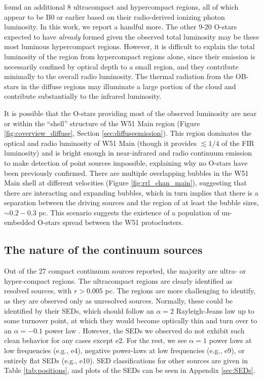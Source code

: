 \citet{Mehringer1994a} found an additional 8 ultracompact and hypercompact \hii
regions, all of which appear to be B0 or earlier based on their radio-derived
ionizing photon luminosity.  In this work, we report a handful more.  The other
9-20 O-stars expected to have \emph{already} formed given the observed total
luminosity may be these most luminous hypercompact \hii regions.  However, it
is difficult to explain the total luminosity of the region from hypercompact
\hii regions alone, since their emission is necessarily confined by optical
depth to a small region, and they contribute minimally to the overall radio
luminosity.  The thermal radiation from the OB-stars in the diffuse \hii
regions may illuminate a large portion of the cloud and contribute
substantially to the
infrared luminosity.

It is possible that the O-stars providing most of the observed
luminosity are near or within the ``shell'' structure of the W51 Main region
(Figure \ref{fig:coverview_diffuse}, Section \ref{sec:diffuseemission}).  This
region dominates the optical and radio luminosity of W51 Main (though it
provides $\lesssim 1/4$ of the FIR luminosity) and is bright enough in
near-infrared and radio continuum emission to make detection of point sources
impossible, explaining why no O-stars have been previously confirmed.  There
are multiple overlapping \hii bubbles in the W51 Main shell at different
velocities (Figure \ref{fig:rrl_chan_main}), suggesting that there are
interacting and  expanding bubbles, which in turn implies that there is a
separation between the driving sources and the \hii region of at least the
bubble sizes, $\sim0.2-0.3$ pc.  This scenario suggests the existence of a
population of un-embedded O-stars spread between the W51 protoclusters.

\subsection{The nature of the continuum sources}
\label{sec:contnature}

Out of the 27 compact continuum sources reported, the majority are ultra- or
hyper-compact \hii regions.  The ultracompact \hii regions are clearly identified
as resolved sources, with $r>0.005$ pc.  The \hchii regions are more
challenging to identify, as they are observed only as unresolved sources.
Normally, these could be identified by their SEDs, which should follow an
$\alpha=2$ Rayleigh-Jeans law up to some turnover point, at which they would
become optically thin and turn over to an $\alpha={-0.1}$ power law
\citep{Wilson2009a}.  However, the SEDs we observed do not exhibit such clean
behavior for any cases except e2.  For the rest, we see $\alpha=1$ power laws
at low frequencies (e.g., e4), negative power-laws at low frequencies (e.g.,
e9), or entirely flat SEDs (e.g., e10).  SED classifications for other sources
are given in Table \ref{tab:positions}, and plots of the SEDs can be seen in
Appendix \ref{sec:SEDs}.


